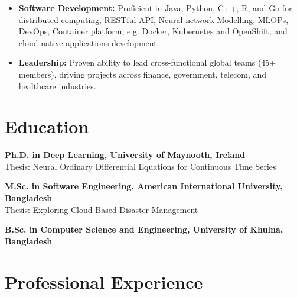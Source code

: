 \documentclass[12pt,]{scrartcl}
\begin{document}
\begin{itemize}
    \item \textbf{Software Development:} Proficient in Java, Python, C++, R, and Go for distributed computing, RESTful API, Neural network Modelling, MLOPs, DevOps, Container platform, e.g. Docker, Kubernetes and OpenShift; and cloud-native applications development.
    
    \item \textbf{Leadership:} Proven ability to lead cross-functional global teams (45+ members), driving projects across finance, government, telecom, and healthcare industries.
\end{itemize}


\vspace{0.3cm}

\section*{Education}
\noindent \textbf{Ph.D. in Deep Learning, University of Maynooth, Ireland} \\
Thesis: Neural Ordinary Differential Equations for Continuous Time Series

\noindent \textbf{M.Sc. in Software Engineering, American International University, Bangladesh}\\
Thesis: Exploring Cloud-Based Disaster Management

\noindent \textbf{B.Sc. in Computer Science and Engineering, University of Khulna, Bangladesh}

\vspace{0.3cm}

\section*{Professional Experience}
\end{document}
